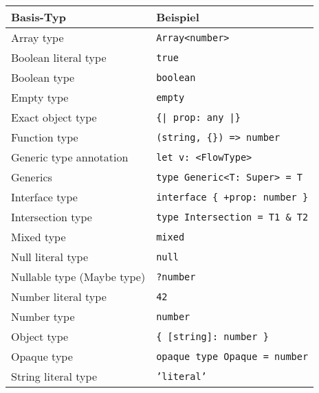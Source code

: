 \begin{table}
  \begin{tabular}{@{}ll@{}}
    \toprule
    \textbf{Basis-Typ}               & \textbf{Beispiel}                                           \\
    \midrule
    Array type                 & \texttt{Array<{}number>{}}                               \\
    Boolean literal type       & \texttt{true}                                            \\
    Boolean type               & \texttt{boolean}                                         \\
    Empty type                 & \texttt{empty}                                           \\
    Exact object type          & \texttt{\{| prop: any |\}}                               \\
    Function type              & \texttt{(string, \{\}) => number}                        \\
    Generic type annotation    & \texttt{let v: <{}FlowType>{}}                           \\
    Generics                   & \texttt{type Generic<{}T: Super> = T}                    \\
    Interface type             & \texttt{interface \{ +prop: number \}}                   \\
    Intersection type          & \texttt{type Intersection = T1 \& T2}                    \\
    Mixed type                 & \texttt{mixed}                                           \\
    Null literal type          & \texttt{null}                                            \\
    Nullable type (Maybe type) & \texttt{?number}                                         \\
    Number literal type        & \texttt{42}                                              \\
    Number type                & \texttt{number}                                          \\
    Object type                & \texttt{\{ {[}string{]}: number \}}                      \\
    Opaque type                & \texttt{opaque type Opaque = number}                     \\
    String literal type        & \texttt{'literal'}                                       \\

\end{tabular}
\end{table}
